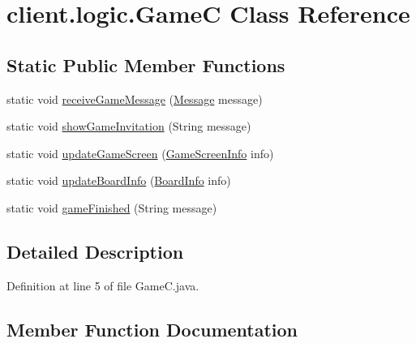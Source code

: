 \hypertarget{classclient_1_1logic_1_1_game_c}{}\section{client.\+logic.\+GameC Class Reference}
\label{classclient_1_1logic_1_1_game_c}
\subsection*{Static Public Member Functions}
\begin{DoxyCompactItemize}
\item 
static void \hyperlink{classclient_1_1logic_1_1_game_c_a70979b2783537bb175c0a8926680e236}{receive\+Game\+Message} (\hyperlink{classsharedlib_1_1tuples_1_1_message}{Message} message)
\item 
static void \hyperlink{classclient_1_1logic_1_1_game_c_a62c530e593e489903a8ab6557763be27}{show\+Game\+Invitation} (String message)
\item 
static void \hyperlink{classclient_1_1logic_1_1_game_c_ae6dfcbeab229817e2e0717ed0bcc2996}{update\+Game\+Screen} (\hyperlink{classsharedlib_1_1tuples_1_1_game_screen_info}{Game\+Screen\+Info} info)
\item 
static void \hyperlink{classclient_1_1logic_1_1_game_c_a336eb8b84428bb738e4760e992d04997}{update\+Board\+Info} (\hyperlink{classsharedlib_1_1tuples_1_1_board_info}{Board\+Info} info)
\item 
static void \hyperlink{classclient_1_1logic_1_1_game_c_afee9b1e47ab82d704759506c4cb5e2ad}{game\+Finished} (String message)
\end{DoxyCompactItemize}


\subsection{Detailed Description}


Definition at line 5 of file Game\+C.\+java.



\subsection{Member Function Documentation}
\hypertarget{classclient_1_1logic_1_1_game_c_afee9b1e47ab82d704759506c4cb5e2ad}{}\label{classclient_1_1logic_1_1_game_c_afee9b1e47ab82d704759506c4cb5e2ad} 
